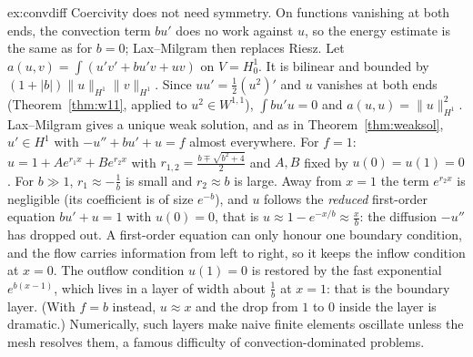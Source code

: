 \begin{solution}{ex:convdiff}
\idea Coercivity does not need symmetry. On functions vanishing at both ends, the convection term $bu'$ does no work against $u$, so the energy estimate is the same as for $b=0$; Lax--Milgram then replaces Riesz.
\writeup Let $a(u,v)=\int(u'v'+bu'v+uv)$ on $V=H^1_0$. It is bilinear and bounded by $(1+|b|)\|u\|_{H^1}\|v\|_{H^1}$. Since $uu'=\frac12(u^2)'$ and $u$ vanishes at both ends (Theorem~\ref{thm:w11}, applied to $u^2\in W^{1,1}$),
$\int bu'u=0$ and $a(u,u)=\|u\|_{H^1}^2$. Lax--Milgram gives a unique weak solution, and as in Theorem~\ref{thm:weaksol}, $u'\in H^1$ with $-u''+bu'+u=f$ almost everywhere. For $f=1$: $u=1+Ae^{r_1x}+Be^{r_2x}$ with
$r_{1,2}=\frac{b\mp\sqrt{b^2+4}}2$ and $A,B$ fixed by $u(0)=u(1)=0$. For $b\gg1$, $r_1\approx-\frac1b$ is small and $r_2\approx b$ is large. Away from $x=1$ the term $e^{r_2x}$ is negligible
(its coefficient is of size $e^{-b}$), and $u$ follows the \emph{reduced} first-order equation $bu'+u=1$ with $u(0)=0$, that is $u\approx1-e^{-x/b}\approx\frac xb$: the diffusion $-u''$ has dropped out. A first-order
equation can only honour one boundary condition, and the flow carries information from left to right, so it keeps the inflow condition at $x=0$. The outflow condition $u(1)=0$ is restored by the fast exponential
$e^{b(x-1)}$, which lives in a layer of width about $\frac1b$ at $x=1$: that is the boundary layer. (With $f=b$ instead, $u\approx x$ and the drop from $1$ to $0$ inside the layer is dramatic.) Numerically,
such layers make naive finite elements oscillate unless the mesh resolves them, a famous difficulty of convection-dominated problems.
\end{solution}

